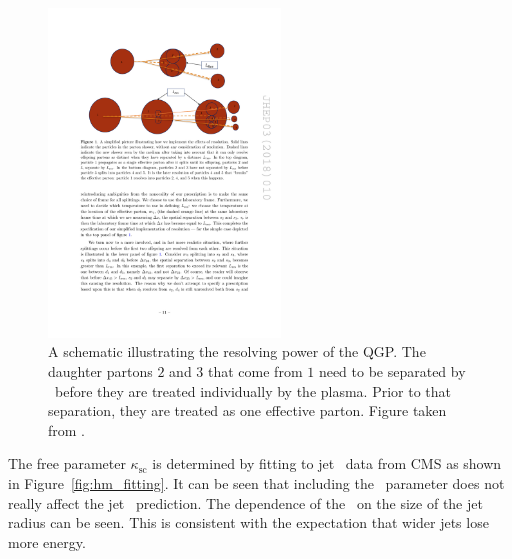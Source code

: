 \begin{figure}[htbp]
\begin{center}
\includegraphics[width=0.55\textwidth]{figures/jetMeasurements/HM_lres}
\caption{A schematic illustrating the resolving power of the QGP. The daughter partons $2$ and $3$ that come from $1$ need to be separated by \Lres\ before they are treated individually by the plasma. Prior to that separation, they are treated as one effective parton. Figure taken from \cite{Hulcher:2017cpt}.}
\label{fig:hm_lres}
\end{center}
\end{figure}


The free parameter $\kappa_\mathrm{sc}$ is determined by fitting to jet \RAA\ data from CMS \cite{Khachatryan:2016jfl} as shown in Figure~\ref{fig:hm_fitting}. It can be seen that including the \Lres\ parameter does not really affect the jet \RAA\ prediction. The dependence of the \RAA\ on the size of the jet radius can be seen. This is consistent with the expectation that wider jets lose more energy.

